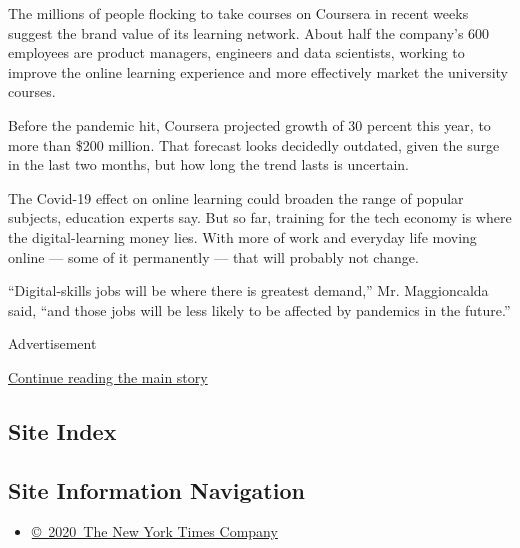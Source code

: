 The millions of people flocking to take courses on Coursera in recent
weeks suggest the brand value of its learning network. About half the
company's 600 employees are product managers, engineers and data
scientists, working to improve the online learning experience and more
effectively market the university courses.

Before the pandemic hit, Coursera projected growth of 30 percent this
year, to more than \$200 million. That forecast looks decidedly
outdated, given the surge in the last two months, but how long the trend
lasts is uncertain.

The Covid-19 effect on online learning could broaden the range of
popular subjects, education experts say. But so far, training for the
tech economy is where the digital-learning money lies. With more of work
and everyday life moving online --- some of it permanently --- that will
probably not change.

``Digital-skills jobs will be where there is greatest demand,'' Mr.
Maggioncalda said, ``and those jobs will be less likely to be affected
by pandemics in the future.''

Advertisement

\protect\hyperlink{after-bottom}{Continue reading the main story}

\hypertarget{site-index}{%
\subsection{Site Index}\label{site-index}}

\hypertarget{site-information-navigation}{%
\subsection{Site Information
Navigation}\label{site-information-navigation}}

\begin{itemize}
\tightlist
\item
  \href{https://help.nytimes.com/hc/en-us/articles/115014792127-Copyright-notice}{©~2020~The
  New York Times Company}
\end{itemize}

